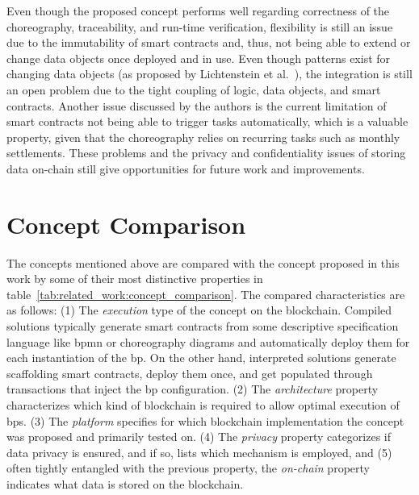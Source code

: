 Even though the proposed concept performs well regarding correctness of the choreography, traceability, and run-time verification, flexibility is still an issue due to the immutability of smart contracts and, thus, not being able to extend or change data objects once deployed and in use. Even though patterns exist for changing data objects (as proposed by Lichtenstein et al.~\cite{data_driven_choreography_data_reusability_lichtenstein}), the integration is still an open problem due to the tight coupling of logic, data objects, and smart contracts. Another issue discussed by the authors is the current limitation of smart contracts not being able to trigger tasks automatically, which is a valuable property, given that the choreography relies on recurring tasks such as monthly settlements. These problems and the privacy and confidentiality issues of storing data on-chain still give opportunities for future work and improvements.



\section{Concept Comparison}
\label{sec:related-work:comparison}
The concepts mentioned above are compared with the concept proposed in this work by some of their most distinctive properties in table~\ref{tab:related_work:concept_comparison}. The compared characteristics are as follows: (1) The \textit{execution} type of the concept on the blockchain. Compiled solutions typically generate smart contracts from some descriptive specification language like \gls{bpmn} or choreography diagrams and automatically deploy them for each instantiation of the \gls{bp}. On the other hand, interpreted solutions generate scaffolding smart contracts, deploy them once, and get populated through transactions that inject the \gls{bp} configuration. (2) The \textit{architecture} property characterizes which kind of blockchain is required to allow optimal execution of \glspl{bp}. (3) The \textit{platform} specifies for which blockchain implementation the concept was proposed and primarily tested on. (4) The \textit{privacy} property categorizes if data privacy is ensured, and if so, lists which mechanism is employed, and (5) often tightly entangled with the previous property, the \textit{on-chain} property indicates what data is stored on the blockchain.


